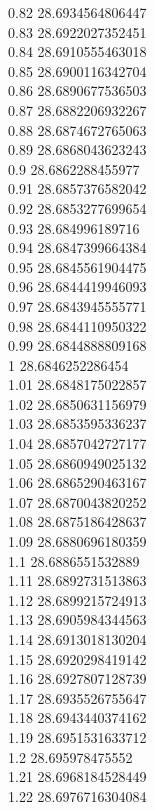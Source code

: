 {0.82	28.6934564806447\\
0.83	28.6922027352451\\
0.84	28.6910555463018\\
0.85	28.6900116342704\\
0.86	28.6890677536503\\
0.87	28.6882206932267\\
0.88	28.6874672765063\\
0.89	28.6868043623243\\
0.9	28.6862288455977\\
0.91	28.6857376582042\\
0.92	28.6853277699654\\
0.93	28.684996189716\\
0.94	28.6847399664384\\
0.95	28.6845561904475\\
0.96	28.6844419946093\\
0.97	28.6843945555771\\
0.98	28.6844110950322\\
0.99	28.6844888809168\\
1	28.6846252286454\\
1.01	28.6848175022857\\
1.02	28.6850631156979\\
1.03	28.6853595336237\\
1.04	28.6857042727177\\
1.05	28.6860949025132\\
1.06	28.6865290463167\\
1.07	28.6870043820252\\
1.08	28.6875186428637\\
1.09	28.6880696180359\\
1.1	28.6886551532889\\
1.11	28.6892731513863\\
1.12	28.6899215724913\\
1.13	28.6905984344563\\
1.14	28.6913018130204\\
1.15	28.6920298419142\\
1.16	28.6927807128739\\
1.17	28.6935526755647\\
1.18	28.6943440374162\\
1.19	28.6951531633712\\
1.2	28.695978475552\\
1.21	28.6968184528449\\
1.22	28.6976716304084\\
}
